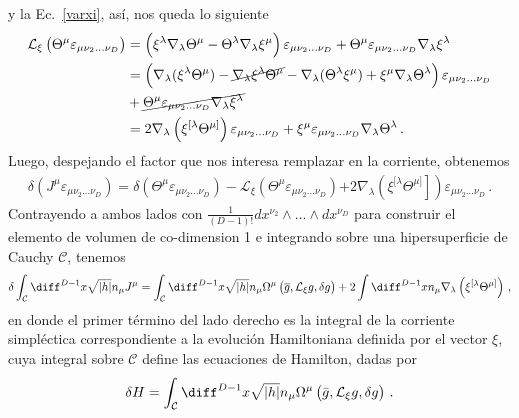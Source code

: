\documentclass[../Main.tex]{subfiles}
\begin{document}
y la Ec.~\eqref{varxi}, así, nos queda lo siguiente 
\begin{align}\notag
\mathcal{L}_{\xi}\left(\Theta^\mu \varepsilon_{\mu \nu_2 \ldots \nu_D}\right)&=\left(\xi^\lambda \nabla_\lambda \Theta^\mu-\Theta^\lambda \nabla_\lambda \xi^\mu\right) \varepsilon_{\mu \nu_2 \ldots \nu_D}+\Theta^\mu \varepsilon_{\mu \nu_2 \ldots \nu_D} \nabla_\lambda \xi^\lambda\\ \notag
&=\left(\nabla_{\lambda}(\xi^{\lambda}\Theta^{\mu})-\cancel{\nabla_{\lambda}\xi^{\lambda}\Theta^{\mu}}-\nabla_{\lambda}(\Theta^{\lambda}\xi^{\mu})+\xi^{\mu}\nabla_{\lambda}\Theta^{\lambda}\right)\varepsilon_{\mu \nu_2 \ldots \nu_D}\\ \notag
&+\cancel{\Theta^\mu \varepsilon_{\mu \nu_2 \ldots \nu_D} \nabla_\lambda \xi^\lambda}\\
&=2 \nabla_\lambda\left(\xi^{[\lambda}\Theta^{\mu]}\right) \varepsilon_{\mu \nu_2 \ldots \nu_D}+\xi^\mu \varepsilon_{\mu \nu_2 \ldots \nu_D} \nabla_\lambda \Theta^\lambda \, .
\end{align}
Luego, despejando el factor que nos interesa remplazar en la corriente, obtenemos 
\begin{align}
\delta\left(J^\mu \varepsilon_{\mu \nu_2 \ldots \nu_D}\right)=\delta\left(\Theta^\mu \varepsilon_{\mu \nu_2\ldots  \nu_D}\right)-\mathcal{L}_{\xi}\left(\Theta^\mu \varepsilon_{\mu \nu_2 \ldots \nu_D}\right)\left.+2 \nabla_\lambda\left(\xi^{[\lambda} \Theta^{\mu]}\right]\right) \varepsilon_{\mu \nu_2 \ldots \nu_D}\,.
\end{align}
Contrayendo a ambos lados con $\frac{1}{(D-1) !} d x^{\nu_2} \wedge \ldots \wedge d x^{\nu_D}$ para construir el elemento de volumen de co-dimension 1 e integrando sobre una hipersuperficie de Cauchy $\mathcal{C}$, tenemos
\begin{align}
\delta \int_{\mathcal{C}} \diff^{D-1}x \sqrt{|h|} n_\mu J^\mu=\int_{\mathcal{C}} \diff^{D-1}x \sqrt{|h|} n_\mu \Omega^\mu\left(\overline{g}, \mathcal{L}_{\xi} g, \delta g\right)+2 \int \diff^{D-1}x n_\mu \nabla_\lambda\left(\xi^{[\lambda} \Theta^{\mu]}\right)\, ,
\end{align}
en donde el primer término del lado derecho es la integral de la  corriente simpléctica correspondiente a la evolución Hamiltoniana definida por el vector $\xi$, cuya integral sobre $\mathcal{C}$ define las ecuaciones de Hamilton, dadas por
\begin{align}
\delta H=\int_{\mathcal{C}} \diff^{D-1} x \sqrt{|h|} n_\mu \Omega^\mu \left(\bar{g}, \mathcal{L}_\xi g, \delta g\right)\, .
\end{align}
\end{document}
